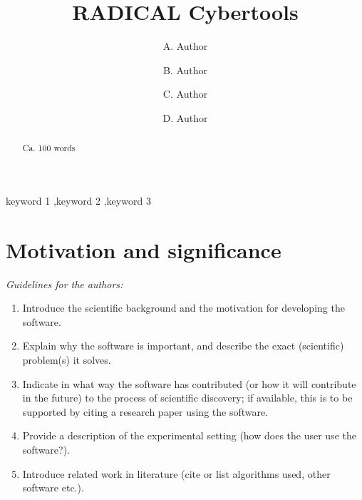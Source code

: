 \documentclass[preprint,12pt, a4paper]{elsarticle}
\begin{document}
\begin{frontmatter}

\title{RADICAL Cybertools}

\author{A. Author}
\address{Your institute, some address}

\author{B. Author}
\address{Your institute, some address}

\author{C. Author}
\address{Your institute, some address}

\author{D. Author}
\address{Your institute, some address}

\begin{abstract}
Ca. 100 words
\end{abstract}

\begin{keyword}
keyword 1 \sep keyword 2 \sep keyword 3



\end{keyword}

\end{frontmatter}

\linenumbers{}



\section{Motivation and significance}\label{sec:motivation}

{\em Guidelines for the authors:
\begin{enumerate}
	\item Introduce the scientific background and the motivation for
		    developing the software.
  \item Explain why the software is important, and describe the exact
        (scientific) problem(s) it solves.
	\item Indicate in what way the software has contributed (or how it will
        contribute in the future) to the process of scientific discovery;
        if available, this is to be supported by citing a research paper
        using the software.
  \item Provide a description of the experimental setting (how does the 
        user use the software?).
  \item Introduce related work in literature (cite or list algorithms 
          used, other software etc.).
\end{enumerate}}
\end{document}
